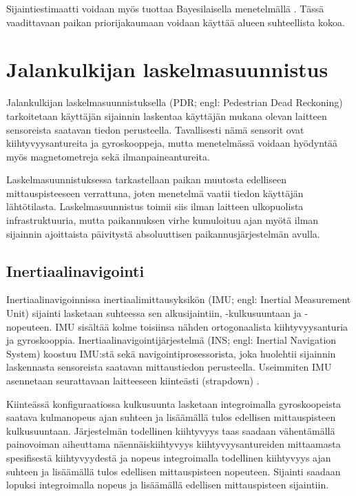 Sijaintiestimaatti voidaan myös tuottaa Bayesilaisella menetelmällä
\cite{honkavirta2009}. Tässä vaadittavaan paikan priorijakaumaan
voidaan käyttää alueen suhteellista kokoa.

\section{Jalankulkijan laskelmasuunnistus}

Jalankulkijan laskelmasuunnistuksella (PDR; engl: Pedestrian Dead Reckoning)
tarkoitetaan käyttäjän sijainnin laskentaa käyttäjän mukana olevan laitteen
sensoreista saatavan tiedon perusteella. Tavallisesti nämä sensorit ovat
kiihtyvyysantureita ja gyroskooppeja, mutta menetelmässä voidaan hyödyntää myös
magnetometreja sekä ilmanpaineantureita.

Laskelmasuunnistuksessa tarkastellaan paikan muutosta edelliseen
mittauspisteeseen verrattuna, joten menetelmä vaatii tiedon käyttäjän
lähtötilasta. Laskelmasuunnistus toimii siis ilman laitteen ulkopuolista
infrastruktuuria, mutta paikannuksen virhe kumuloituu ajan myötä ilman
sijainnin ajoittaista päivitystä absoluuttisen paikannusjärjestelmän
avulla.

\subsection{Inertiaalinavigointi}

Inertiaalinavigoinnissa inertiaalimittausyksikön (IMU; engl: Inertial
Measurement Unit) sijainti lasketaan suhteessa sen alkusijaintiin,
-kulkusuuntaan ja -nopeuteen. IMU sisältää kolme toisiinsa nähden
ortogonaalista kiihtyvyysanturia ja gyroskooppia.
Inertiaalinavigointijärjestelmä (INS; engl: Inertial Navigation System) koostuu
IMU:stä sekä navigointiprosessorista, joka huolehtii sijainnin laskennasta
sensoreista saatavan mittaustiedon perusteella. Useimmiten IMU asennetaan
seurattavaan laitteeseen kiinteästi (strapdown) \cite{harle2013}.

Kiinteässä konfiguraatiossa kulkusuunta lasketaan
integroimalla gyroskoopeista saatava kulmanopeus ajan suhteen ja lisäämällä
tulos edellisen mittauspisteen kulkusuuntaan. Järjestelmän todellinen
kiihtyvyys taas saadaan vähentämällä painovoiman aiheuttama näennäiskiihtyvyys
kiihtyvyysantureiden mittaamasta spesifisestä kiihtyvyydestä ja nopeus
integroimalla todellinen kiihtyvyys ajan suhteen ja lisäämällä tulos edellisen
mittauspisteen nopeuteen. Sijainti saadaan lopuksi integroimalla nopeus ja
lisäämällä edellisen mittauspisteen sijaintiin.

